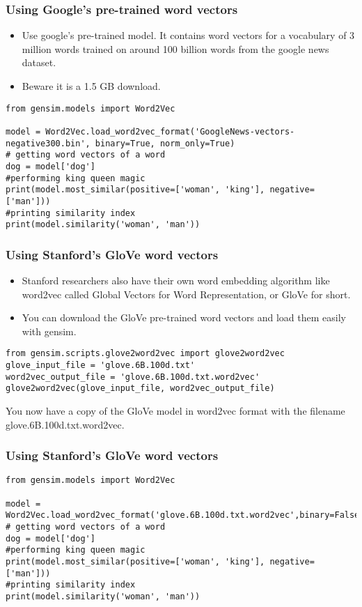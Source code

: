 \begin{frame}[fragile]\frametitle{Using Google's pre-trained word vectors}
\begin{itemize}
\item Use google's pre-trained model. It contains word vectors for a vocabulary of 3 million words trained on around 100 billion words from the google news dataset.
\item Beware it is a 1.5 GB download.
\end{itemize}
\begin{lstlisting}
from gensim.models import Word2Vec

model = Word2Vec.load_word2vec_format('GoogleNews-vectors-negative300.bin', binary=True, norm_only=True)
# getting word vectors of a word
dog = model['dog']
#performing king queen magic
print(model.most_similar(positive=['woman', 'king'], negative=['man']))
#printing similarity index
print(model.similarity('woman', 'man'))
\end{lstlisting}
\end{frame}


\begin{frame}[fragile]\frametitle{Using Stanford’s GloVe word vectors}
\begin{itemize}
\item Stanford researchers also have their own word embedding algorithm like word2vec called Global Vectors for Word Representation, or GloVe for short.
\item You can download the GloVe pre-trained word vectors and load them easily with gensim.
\end{itemize}
\begin{lstlisting}
from gensim.scripts.glove2word2vec import glove2word2vec
glove_input_file = 'glove.6B.100d.txt'
word2vec_output_file = 'glove.6B.100d.txt.word2vec'
glove2word2vec(glove_input_file, word2vec_output_file)
\end{lstlisting}
You now have a copy of the GloVe model in word2vec format with the filename glove.6B.100d.txt.word2vec.
\end{frame}

\begin{frame}[fragile]\frametitle{Using Stanford’s GloVe word vectors}
\begin{lstlisting}
from gensim.models import Word2Vec

model = Word2Vec.load_word2vec_format('glove.6B.100d.txt.word2vec',binary=False)
# getting word vectors of a word
dog = model['dog']
#performing king queen magic
print(model.most_similar(positive=['woman', 'king'], negative=['man']))
#printing similarity index
print(model.similarity('woman', 'man'))
\end{lstlisting}
\end{frame}


